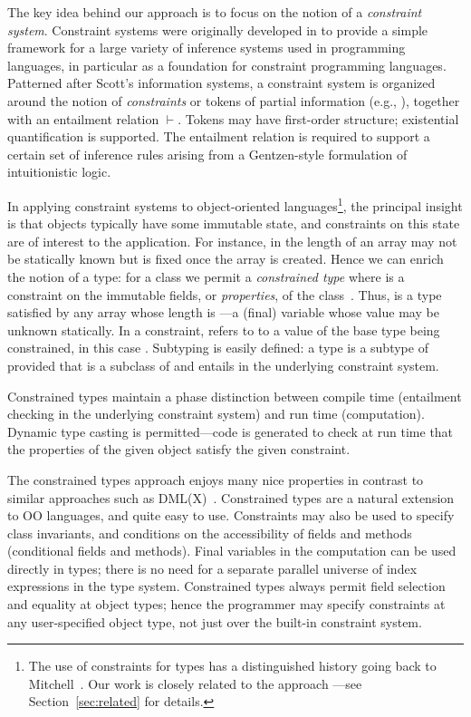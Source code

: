 The key idea behind our approach is to focus on the notion of a
\emph{constraint system}. Constraint systems were originally developed in
\cite{cccc} to provide a simple framework for a large variety of
inference systems used in programming languages, in particular as a
foundation for constraint programming languages.  Patterned after
Scott's information systems, a constraint system is
organized around the notion of \emph{constraints} or tokens of partial
information (e.g., ), together with an entailment
relation $\vdash$.  Tokens may have first-order structure; existential
quantification is supported. The entailment relation is required to
support a certain set of inference rules arising from a Gentzen-style
formulation of intuitionistic logic.

In applying constraint systems to object-oriented
languages\footnote{The use of constraints for types has a
distinguished history going back to Mitchell~\cite{mitchell84}.
Our work is closely related to the \hmx{} approach
\cite{sulzmann97type}---see Section~\ref{sec:related} for
details.}, the principal insight
is that objects typically have some immutable state, and constraints on
this state are of interest to the application.  For instance, in \Java{}
the length of an array may not be statically known but is fixed once
the array is created. Hence we can enrich the notion of a type: for a
class  we permit a \emph{constrained type}  where 
is a
constraint on the immutable fields, or \emph{properties}, of the
class~\cite{constrained-types}. Thus, 
 is a type satisfied by any array whose length
is ---a (final) variable whose value may be unknown
statically. In a constraint,  refers to 
to a value of the base type being constrained, in this case .
Subtyping is easily defined: a type  is a
subtype of  
provided that  is a subclass of  and 
entails  in the underlying constraint system.

Constrained types maintain a phase distinction between compile time
(entailment checking in the underlying constraint system) and run time
(computation).  Dynamic type casting is permitted---code is generated
to check at run time that the properties of the given object satisfy
the given constraint.

The constrained types approach enjoys many nice properties in contrast
to similar approaches such as DML(X)~\cite{xi99dependent}.  Constrained
types are a natural extension to OO languages, and quite easy to
use. Constraints may also be used to specify class invariants, and
conditions on the accessibility of fields and methods (conditional
fields and methods).  Final variables in the computation can be used
directly in types; there is no need for a separate parallel universe
of index expressions in the type system.  Constrained types always
permit field selection and equality at object types; hence the
programmer may specify constraints at any user-specified object type,
not just over the built-in constraint system.  


